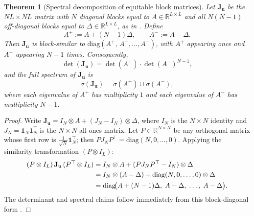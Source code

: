 \documentclass{article}
\newtheorem{theorem}{Theorem}[section]
\begin{document}
            \begin{theorem}[Spectral decomposition of equitable block matrices]\label{thm:SI_Soth}
                Let $\mathbf{J}_{\mathbf{u}}$ be the $NL\times NL$ matrix with $N$ diagonal blocks equal to $A\in\mathbb{R}^{L\times L}$ and all $N(N-1)$ off-diagonal blocks equal to $\Delta\in\mathbb{R}^{L\times L}$, as in . Define
                \begin{equation}\label{eq:SI_Apm_def}
                    A^{+} := A + (N-1)\Delta, \qquad A^{-} := A - \Delta.
                \end{equation}
                Then $\mathbf{J}_{\mathbf{u}}$ is block-similar to $\mathrm{diag}(A^{+},\,A^{-},\dots,A^{-})$, with $A^+$ appearing once and $A^-$ appearing $N-1$ times. Consequently,
                \begin{equation}
                    \det(\mathbf{J}_{\mathbf{u}}) = \det(A^{+})\cdot\det(A^{-})^{N-1},
                \end{equation}
                and the full spectrum of $\mathbf{J}_{\mathbf{u}}$ is
                \begin{equation}
                    \sigma(\mathbf{J}_{\mathbf{u}}) = \sigma(A^{+})\cup\sigma(A^{-}),
                \end{equation}
                where each eigenvalue of $A^+$ has multiplicity $1$ and each eigenvalue of $A^-$ has multiplicity $N-1$.
            \end{theorem}

            \begin{proof}
                Write $\mathbf{J}_{\mathbf{u}} = I_N\otimes A + (J_N - I_N)\otimes\Delta$, where $I_N$ is the $N\times N$ identity and $J_N = \mathbf{1}_N\mathbf{1}_N^\top$ is the $N\times N$ all-ones matrix. Let $P\in\mathbb{R}^{N\times N}$ be any orthogonal matrix whose first row is $\frac{1}{\sqrt{N}}\mathbf{1}_N^\top$; then $PJ_NP^\top = \mathrm{diag}(N,0,\dots,0)$. Applying the similarity transformation $(P\otimes I_L)$:
                \begin{align}
                    (P\otimes I_L)\,\mathbf{J}_{\mathbf{u}}\,(P^\top\otimes I_L)
                    &= I_N\otimes A + (PJ_NP^\top - I_N)\otimes\Delta \notag\\
                    &= I_N\otimes(A-\Delta) + \mathrm{diag}(N,0,\dots,0)\otimes\Delta \notag\\
                    &= \mathrm{diag}\!\bigl(A+(N-1)\Delta,\;A-\Delta,\;\dots,\;A-\Delta\bigr).
                \end{align}
                The determinant and spectral claims follow immediately from this block-diagonal form \cite{silvester2000determinants}.
            \end{proof}
\end{document}

